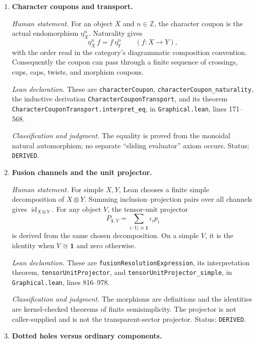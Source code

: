 \begin{enumerate}[label=\textbf{E\arabic*.},leftmargin=*]
\emph{Classification and judgment.}
This is a definition.  The equalities comparing exterior input and output
ports to a cut port use only the puncture's component and orientation
preservation fields.  Disk-intersection direction never enters this choice.
Status: \texttt{MATCH}.

\item \textbf{Character coupons and transport.}

\emph{Human statement.}
For an object $X$ and $n\in\mathbb Z$, the character coupon is the actual
endomorphism $\eta_X^n$.  Naturality gives
\[
 \eta_X^n\,f=f\,\eta_Y^n
 \qquad(f\colon X\to Y),
\]
with the order read in the category's diagrammatic composition convention.
Consequently the coupon can pass through a finite sequence of crossings,
cups, caps, twists, and morphism coupons.

\emph{Lean declaration.}
These are \nolinkurl{characterCoupon},
\nolinkurl{characterCoupon_naturality}, the inductive derivation
\nolinkurl{CharacterCouponTransport}, and its theorem
\nolinkurl{CharacterCouponTransport.interpret_eq}, in
\nolinkurl{Graphical.lean}, lines 171--568.

\emph{Classification and judgment.}
The equality is proved from the monoidal natural automorphism; no separate
``sliding evaluator'' axiom occurs.  Status: \texttt{DERIVED}.

\item \textbf{Fusion channels and the unit projector.}

\emph{Human statement.}
For simple $X,Y$, Lean chooses a finite simple decomposition of $X\otimes Y$.
Summing inclusion--projection pairs over all channels gives
$\operatorname{id}_{X\otimes Y}$.  For any object $V$, the tensor-unit
projector
\[
 P_{\mathbf1,V}=\sum_{i:\,V_i\cong\mathbf1}\iota_i p_i
\]
is derived from the same chosen decomposition.  On a simple $V$, it is the
identity when $V\cong\mathbf1$ and zero otherwise.

\emph{Lean declaration.}
These are \nolinkurl{fusionResolutionExpression}, its interpretation theorem,
\nolinkurl{tensorUnitProjector}, and
\nolinkurl{tensorUnitProjector_simple}, in \nolinkurl{Graphical.lean}, lines
816--978.

\emph{Classification and judgment.}
The morphisms are definitions and the identities are kernel-checked theorems
of finite semisimplicity.  The projector is not caller-supplied and is not the
transparent-sector projector.  Status: \texttt{DERIVED}.

\item \textbf{Dotted holes versus ordinary components.}


\end{enumerate}
